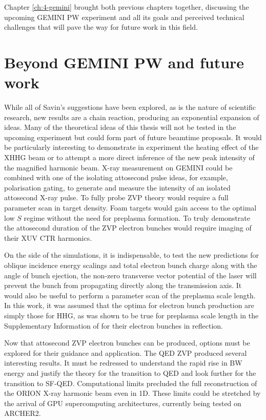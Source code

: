 Chapter \ref{ch:4-gemini} brought both previous chapters together, discussing the upcoming GEMINI PW experiment and all its goals and perceived technical challenges that will pave the way for future work in this field.

\section{Beyond GEMINI PW and future work}\label{sec:ch4-beyond}
While all of Savin's suggestions have been explored, as is the nature of scientific research, new results are a chain reaction, producing an exponential expansion of ideas. Many of the theoretical ideas of this thesis will not be tested in the upcoming experiment but could form part of future beamtime proposals. It would be particularly interesting to demonstrate in experiment the heating effect of the XHHG beam or to attempt a more direct inference of the new peak intensity of the magnified harmonic beam. X-ray measurement on GEMINI could be combined with one of the isolating attosecond pulse ideas, for example, polarisation gating, to generate and measure the intensity of an isolated attosecond X-ray pulse. To fully probe ZVP theory would require a full parameter scan in target density. Foam targets would gain access to the optimal low $S$ regime \cite{bataniPhysicsIssuesShock2014} without the need for preplasma formation. To truly demonstrate the attosecond duration of the ZVP electron bunches would require imaging of their XUV CTR harmonics.

On the side of the simulations, it is indispensable, to test the new predictions for oblique incidence energy scalings and total electron bunch charge along with the angle of bunch ejection, the non-zero transverse vector potential of the laser will prevent the bunch from propagating directly along the transmission axis. It would also be useful to perform a parameter scan of the preplasma scale length. In this work, it was assumed that the optima for electron bunch production are simply those for \ac{HHG}, as was shown to be true for preplasma scale length in the Supplementary Information of \cite{thevenetVacuumLaserAcceleration2016} for their electron bunches in reflection. 

Now that attosecond ZVP electron bunches can be produced, options must be explored for their guidance and application. The QED ZVP produced several interesting results. It must be redressed to understand the rapid rise in BW energy and justify the theory for the transition to QED and look further for the transition to SF-QED. Computational limits precluded the full reconstruction of the ORION X-ray harmonic beam even in 1D. These limits could be stretched by the arrival of GPU supercomputing architectures, currently being tested on ARCHER2. 

